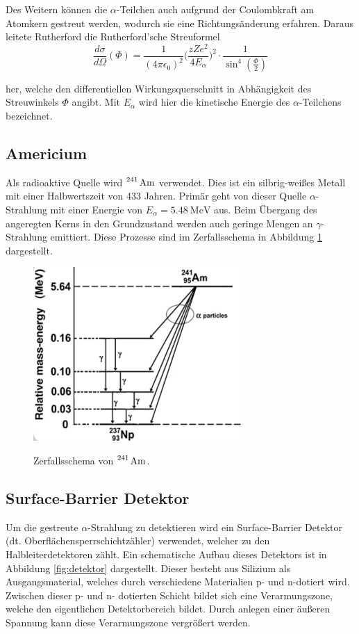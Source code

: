 Des Weitern können die $\alpha$-Teilchen auch aufgrund der Coulombkraft am Atomkern gestreut werden, wodurch sie eine
Richtungsänderung erfahren. Daraus leitete Rutherford die Rutherford'sche Streuformel
\begin{equation}
  \frac{d\sigma}{d\Omega}(\Phi)=\frac{1}{(4\pi \epsilon_0)^2}\Bigg(\frac{zZe^2}{4E_{\alpha}}\Bigg)^2
  \cdot\frac{1}{\sin^4{(\frac{\Phi}{2})}}
  \label{eqn:Rutherford}
\end{equation}

her, welche den differentiellen Wirkungsquerschnitt in Abhängigkeit des Streuwinkels $\Phi$ angibt. Mit $E_{\alpha}$
wird hier die kinetische Energie des $\alpha$-Teilchens bezeichnet.

\subsection{Americium}

Als radioaktive Quelle wird $\ce{^{241} Am}$ verwendet. Dies ist ein silbrig-weißes Metall mit einer
Halbwertszeit von 433 Jahren. Primär geht von dieser Quelle $\alpha$-Strahlung mit einer Energie von
$E_{\alpha}=\SI{5,48}{\MeV}$ aus. Beim Übergang des angeregten Kerns in den Grundzustand werden auch geringe
Mengen an $\gamma$-Strahlung emittiert. Diese Prozesse sind im Zerfallsschema in Abbildung \ref{fig:Zerfall}
dargestellt.

\begin{figure}[H]
  \centering
  \includegraphics[width=8cm]{zerfall2.png}
  \caption{Zerfallsschema von $\ce{^{241} Am}$. }
  \label{fig:Zerfall}
  \cite{zerfall}
\end{figure}

\subsection{Surface-Barrier Detektor}
Um die gestreute $\alpha$-Strahlung zu detektieren wird ein Surface-Barrier Detektor
(dt. Oberflächensperrschichtzähler) verwendet, welcher zu den Halbleiterdetektoren zählt.
Ein schematische Aufbau dieses Detektors ist in Abbildung \ref{fig:detektor} dargestellt.
Dieser besteht aus Silizium als Ausgangsmaterial, welches durch verschiedene Materialien
p- und n-dotiert wird. Zwischen dieser p- und n- dotierten Schicht bildet sich eine Verarmungszone,
welche den eigentlichen Detektorbereich bildet. Durch anlegen einer äußeren Spannung kann diese
Verarmungszone vergrößert werden.


